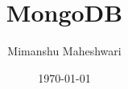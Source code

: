 \documentclass{report}
\title{\textbf{MongoDB}}
\author{Mimanshu Maheshwari}
\date{\today}
\begin{document}
\maketitle
\tableofcontents
\listoffigures
\lstlistoflistings





\printglossaries
\end{document}
